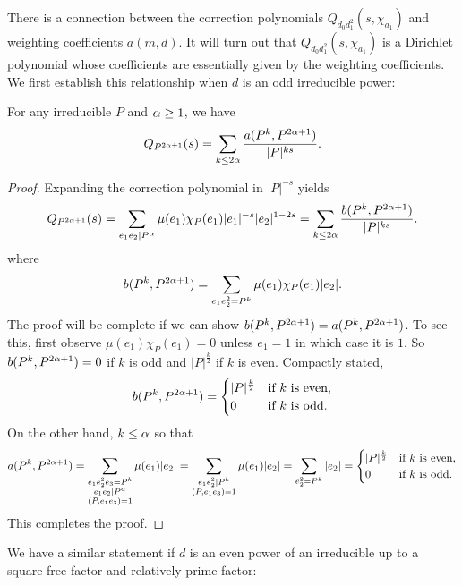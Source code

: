 \documentclass[12pt,reqno,oneside]{amsart}
\begin{document}
    There is a connection between the correction polynomials $Q_{d_{0}d_{1}^{2}}(s,\chi_{a_{1}})$ and weighting coefficients $a(m,d)$. It will turn out that $Q_{d_{0}d_{1}^{2}}(s,\chi_{a_{1}})$ is a Dirichlet polynomial whose coefficients are essentially given by the weighting coefficients. We first establish this relationship when $d$ is an odd irreducible power:

    \begin{lemma}\label{lem:prime_correction_odd}
        For any irreducible $P$ and $\alpha \ge 1$, we have
        \[
            Q_{P^{2\alpha+1}}(s) = \sum_{k \le 2\alpha}\frac{a(P^{k},P^{2\alpha+1})}{|P|^{ks}}.
        \]
    \end{lemma}
    \begin{proof}
        Expanding the correction polynomial in $|P|^{-s}$ yields
        \[
            Q_{P^{2\alpha+1}}(s) = \sum_{e_{1}e_{2} \mid P^{\alpha}}\mu(e_{1})\chi_{P}(e_{1})|e_{1}|^{-s}|e_{2}|^{1-2s} = \sum_{k \le 2\alpha}\frac{b(P^{k},P^{2\alpha+1})}{|P|^{ks}}.
        \]
        where
        \[
            b(P^{k},P^{2\alpha+1}) = \sum_{e_{1}e_{2}^{2} = P^{k}}\mu(e_{1})\chi_{P}(e_{1})|e_{2}|.
        \]
        The proof will be complete if we can show $b(P^{k},P^{2\alpha+1}) = a(P^{k},P^{2\alpha+1})$. To see this, first observe $\mu(e_{1})\chi_{P}(e_{1}) = 0$ unless $e_{1} = 1$ in which case it is $1$. So $b(P^{k},P^{2\alpha+1}) = 0$ if $k$ is odd and $|P|^{\frac{k}{2}}$ if $k$ is even. Compactly stated,
        \[
            b(P^{k},P^{2\alpha+1}) = \begin{cases} |P|^{\frac{k}{2}} & \text{if $k$ is even}, \\ 0 & \text{if $k$ is odd}. \end{cases}
        \]
        On the other hand, $k \le \alpha$ so that
        \[
            a(P^{k},P^{2\alpha+1}) = \sum_{\substack{e_{1}e_{2}^{2}e_{3} = P^{k} \\ e_{1}e_{2} \mid P^{\alpha} \\ (P,e_{1}e_{3}) = 1}}\mu(e_{1})|e_{2}| = \sum_{\substack{e_{1}e_{2}^{2} \mid P^{k} \\ (P,e_{1}e_{3}) = 1}}\mu(e_{1})|e_{2}| = \sum_{e_{2}^{2} = P^{k}}|e_{2}| =  \begin{cases} |P|^{\frac{k}{2}} & \text{if $k$ is even}, \\ 0 & \text{if $k$ is odd}. \end{cases}
        \]
        This completes the proof.
    \end{proof}

    We have a similar statement if $d$ is an even power of an irreducible up to a square-free factor and relatively prime factor:
    
\end{document}
